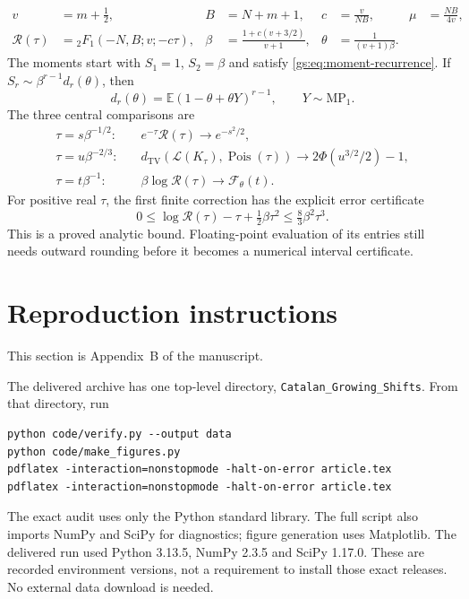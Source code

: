 \documentclass[11pt,a4paper]{article}
\numberwithin{equation}{section}
\theoremstyle{definition}
\theoremstyle{remark}
\newcommand{\Rgs}{\mathcal R}
\newcommand{\Egs}{\mathbb E}
\newcommand{\Pois}{\operatorname{Pois}}
\newcommand{\TV}{d_{\mathrm{TV}}}
\newcommand{\MP}{\mathrm{MP}_1}
\newcommand{\Law}{\mathcal L}
\newcommand{\calF}{\mathcal F}
\begin{document}
\begin{align*}
 v&=m+\tfrac12,& B&=N+m+1,&c&=\frac v{NB},&\mu&=\frac{NB}{4v},\\
 \Rgs(\tau)&={}_2F_1(-N,B;v;-c\tau),&
 \beta&=\frac{1+c(v+3/2)}{v+1},&
 \theta&=\frac1{(v+1)\beta}.
\end{align*}
The moments start with $S_1=1$, $S_2=\beta$ and satisfy
\eqref{gs:eq:moment-recurrence}. If $S_r\sim\beta^{r-1}d_r(\theta)$,
then
\[
 d_r(\theta)=\Egs(1-\theta+\theta Y)^{r-1},\qquad Y\sim\MP.
\]
The three central comparisons are
\begin{align*}
 \tau=s\beta^{-1/2}:\quad&
 e^{-\tau}\Rgs(\tau)\to e^{-s^2/2},\\
 \tau=u\beta^{-2/3}:\quad&
 \TV(\Law(K_\tau),\Pois(\tau))\to2\Phi(u^{3/2}/2)-1,\\
 \tau=t\beta^{-1}:\quad&
 \beta\log\Rgs(\tau)\to\calF_\theta(t).
\end{align*}
For positive real $\tau$, the first finite correction has the explicit
error certificate
\[
 0\le\log\Rgs(\tau)-\tau+\tfrac12\beta\tau^2
 \le\tfrac83\beta^2\tau^3.
\]
This is a proved analytic bound. Floating-point evaluation of its entries
still needs outward rounding before it becomes a numerical interval
certificate.

\section{Reproduction instructions}\label{gs:app:reproduction}

This section is Appendix~B of the manuscript.

The delivered archive has one top-level directory,
\texttt{Catalan\_Growing\_Shifts}. From that directory, run
\begin{verbatim}
python code/verify.py --output data
python code/make_figures.py
pdflatex -interaction=nonstopmode -halt-on-error article.tex
pdflatex -interaction=nonstopmode -halt-on-error article.tex
\end{verbatim}
The exact audit uses only the Python standard library. The full script
also imports NumPy and SciPy for diagnostics; figure generation uses
Matplotlib. The delivered run used Python 3.13.5, NumPy 2.3.5 and SciPy
1.17.0. These are recorded environment versions, not a requirement to
install those exact releases. No external data download is needed.
\end{document}
